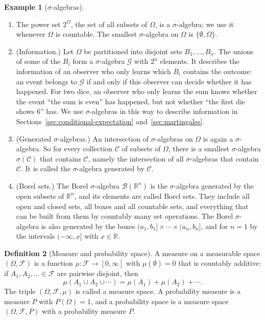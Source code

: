 \documentclass[11pt]{article}
\theoremstyle{definition}
\newtheorem{definition}{Definition}[section]
\newtheorem{example}[definition]{Example}
\theoremstyle{plain}
\theoremstyle{remark}
\begin{document}
\begin{example}[$\sigma$-algebras]\label{ex:sigma-algebras}
    \begin{enumerate}
        \item The power set $2^\Omega$, the set of all subsets of $\Omega$, is a $\sigma$-algebra; we use it whenever $\Omega$ is countable. The smallest $\sigma$-algebra on $\Omega$ is $\{\emptyset, \Omega\}$.
        \item (Information.) Let $\Omega$ be partitioned into disjoint sets $B_1, \ldots, B_n$. The unions of some of the $B_i$ form a $\sigma$-algebra $\mathcal{G}$ with $2^n$ elements. It describes the information of an observer who only learns which $B_i$ contains the outcome: an event belongs to $\mathcal{G}$ if and only if this observer can decide whether it has happened. For two dice, an observer who only learns the sum knows whether the event ``the sum is even'' has happened, but not whether ``the first die shows $6$'' has. We use $\sigma$-algebras in this way to describe information in Sections~\ref{sec:conditional-expectation} and~\ref{sec:martingales}.
        \item (Generated $\sigma$-algebras.) An intersection of $\sigma$-algebras on $\Omega$ is again a $\sigma$-algebra. So for every collection $\mathcal{C}$ of subsets of $\Omega$, there is a smallest $\sigma$-algebra $\sigma(\mathcal{C})$ that contains $\mathcal{C}$, namely the intersection of all $\sigma$-algebras that contain $\mathcal{C}$. It is called the $\sigma$-algebra generated by $\mathcal{C}$.
        \item (Borel sets.) The Borel $\sigma$-algebra $\mathcal{B}(\mathbb{R}^n)$ is the $\sigma$-algebra generated by the open subsets of $\mathbb{R}^n$, and its elements are called Borel sets. They include all open and closed sets, all boxes and all countable sets, and everything that can be built from them by countably many set operations. The Borel $\sigma$-algebra is also generated by the boxes $(a_1, b_1] \times \cdots \times (a_n, b_n]$, and for $n = 1$ by the intervals $(-\infty, x]$ with $x \in \mathbb{R}$.
    \end{enumerate}
\end{example}

\begin{definition}[Measure and probability space]\label{def:measure}
    A measure on a measurable space $(\Omega, \mathcal{F})$ is a function $\mu: \mathcal{F} \to [0, \infty]$ with $\mu(\emptyset) = 0$ that is countably additive: if $A_1, A_2, \ldots \in \mathcal{F}$ are pairwise disjoint, then
    \[\mu(A_1 \cup A_2 \cup \cdots) = \mu(A_1) + \mu(A_2) + \cdots.\]
    The triple $(\Omega, \mathcal{F}, \mu)$ is called a measure space. A probability measure is a measure $P$ with $P(\Omega) = 1$, and a probability space is a measure space $(\Omega, \mathcal{F}, P)$ with a probability measure $P$.
\end{definition}
\end{document}
